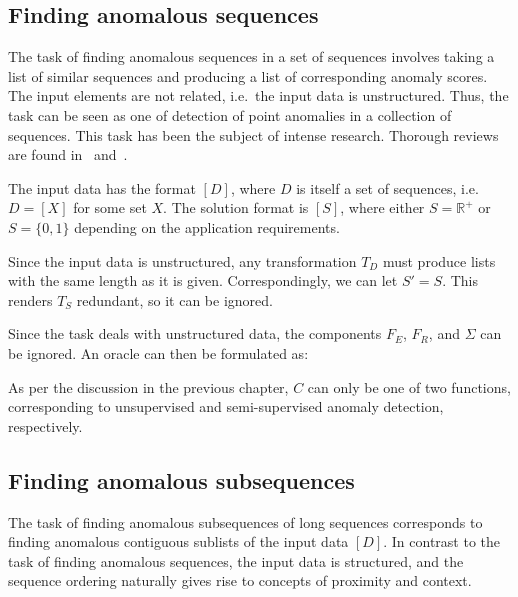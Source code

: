 \subsection{Finding anomalous sequences}

The task of finding anomalous sequences in a set of sequences involves taking a list of similar sequences and producing a list of corresponding anomaly scores. The input elements are not related, i.e.\ the input data is unstructured. Thus, the task can be seen as one of detection of point anomalies in a collection of sequences. This task has been the subject of intense research. Thorough reviews are found in~\cite{chandola2} and~\cite{chandola3}.

The input data has the format $[D]$, where $D$ is itself a set of sequences, i.e.\ $D = [X]$ for some set $X$. The solution format is $[S]$, where either $S = \mathbb{R}^+$ or $S = \{0, 1\}$ depending on the application requirements.

Since the input data is unstructured, any transformation $T_D$ must produce lists with the same length as it is given. Correspondingly, we can let $S' = S$. This renders $T_S$ redundant, so it can be ignored.

Since the task deals with unstructured data, the components $F_E$, $F_R$, and $\Sigma$ can be ignored. An oracle can then be formulated as:

\begin{algorithmic}
     
    \EndFor{}
\end{algorithmic}

As per the discussion in the previous chapter, $C$ can only be one of two functions, corresponding to unsupervised and semi-supervised anomaly detection, respectively.

\subsection{Finding anomalous subsequences}

The task of finding anomalous subsequences of long sequences corresponds to finding anomalous contiguous sublists of the input data $[D]$. In contrast to the task of finding anomalous sequences, the input data is structured, and the sequence ordering naturally gives rise to concepts of proximity and context.

